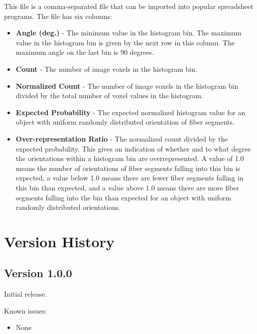 \documentclass[11pt,titlepage,twoside]{article}
\begin{document}
\begin{description}
This file is a comma-separated file that can be imported into popular spreadsheet programs. The file has six columns:

\begin{itemize}

  \item \textbf{Angle (deg.)} - The minimum value in the histogram bin. The maximum value in the histogram bin is given by the next row in this column. The maximum angle on the last bin is 90 degrees.
  
  \item \textbf{Count} - The number of image voxels in the histogram bin.
  
  \item \textbf{Normalized Count} - The number of image voxels in the histogram bin divided by the total number of voxel values in the histogram.

  \item \textbf{Expected Probability} - The expected normalized histogram value for an object with uniform randomly distributed orientation of fiber segments.
  
  \item \textbf{Over-representation Ratio} - The normalized count divided by the expected probability. This gives an indication of whether and to what degree the orientations within a histogram bin are overrepresented. A value of 1.0 means the number of orientations of fiber segments falling into this bin is expected, a value below 1.0 means there are fewer fiber segments falling in this bin than expected, and a value above 1.0 means there are more fiber segments falling into the bin than expected for an object with uniform randomly distributed orientations.

\end{itemize}

\end{description}


\section{Version History}

\subsection{Version 1.0.0}


Initial release.

\noindent
Known issues:
\begin{itemize}

\item None

\end{itemize}
\end{document}

